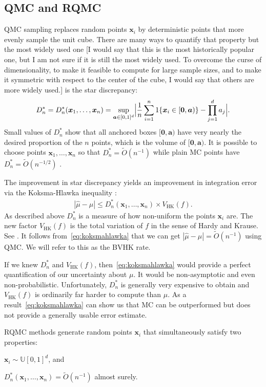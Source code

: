 \documentclass{article}
\newcommand{\fred}[1]{\begingroup\color{red}#1\endgroup}
\renewcommand{\le}{\leqslant}
\newcommand{\bsa}{\boldsymbol{a}}
\newcommand{\bsx}{\boldsymbol{x}}
\newcommand{\bszero}{\boldsymbol{0}}
\newcommand{\dunif}{\mathbb{U}}
\newcommand{\hk}{\mathrm{HK}}
\begin{document}
\subsection{QMC and RQMC}

QMC sampling replaces random points $\bsx_i$ by 
deterministic points that more evenly sample the
unit cube.  There are many ways to quantify that 
property but the most widely used one \fred{[I would say that this is the most historically popular one, but I am not sure if it is still the most widely used.  To overcome the curse of dimensionality,  to make it feasible to compute for large sample sizes, and to make it symmetric with respect to the center of the cube, I would say that others are more widely used.] } is the
star discrepancy:
$$
D_n^* = D_n^*(\bsx_1,\dots,\bsx_n)=\sup_{\bsa\in[0,1]^d}
\Bigl| \frac1n\sum_{i=1}^n1\{\bsx_i\in[\bszero,\bsa)\}
-\prod_{j=1}^da_j\Bigr|.
$$
Small values of $D_n^*$ show that all anchored boxes $[\bszero,\bsa)$
have very nearly the desired proportion of the $n$ points,
which is the volume of $[\bszero,\bsa)$.
It is possible to choose points $\bsx_1,\dots,\bsx_n$ so
that $D_n^*=\tilde O(n^{-1})$ while plain MC points
have $D_n^*=\tilde O(n^{-1/2})$ \cite{Nie92}.

The improvement in star discrepancy yields an improvement
in integration error via the Koksma-Hlawka inequality \cite{Hic04a}:
\begin{align}\label{eq:koksmahlawka}
|\hat\mu-\mu|\le D_n^*(\bsx_1,\dots,\bsx_n)\times V_{\hk}(f).
\end{align}
As described above $D_n^*$ is a measure of how non-uniform
the points $\bsx_i$ are. The new factor $V_{\hk}(f)$ is the
total variation of $f$ in the sense of Hardy and Krause.
See \cite{Owe05a}. It follows from~\eqref{eq:koksmahlawka} 
that we can get $|\hat\mu-\mu|=\tilde O(n^{-1})$
using QMC. We will refer to this as the BVHK rate.

If we knew $D_n^*$ and $V_\hk(f)$, then~\eqref{eq:koksmahlawka} would provide a
perfect quantification of our uncertainty about $\mu$.
It would be non-asymptotic and even non-probabilistic.
Unfortunately, $D_n^*$ is generally very expensive
to obtain and $V_{\hk}(f)$ is ordinarily far harder
to compute than $\mu$. As a result~\eqref{eq:koksmahlawka}
can show us that MC can be outperformed but does
not provide a generally usable error estimate.

RQMC methods generate random points $\bsx_i$ that
simultaneously satisfy two properties:
\begin{compactenum}[\quad\bf1)]
\item $\bsx_i\sim\dunif[0,1]^d$, and
\item $D_n^*(\bsx_1,\dots,\bsx_n)=\tilde O(n^{-1})$ almost surely.
\end{compactenum}
\end{document}
